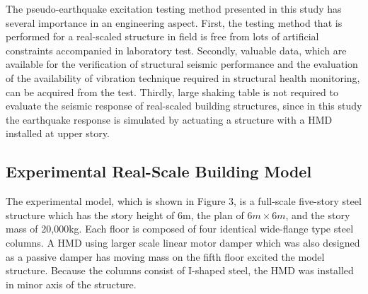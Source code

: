 The pseudo-earthquake excitation testing method presented in this study has several importance in an engineering aspect. First, the testing method that is performed for a real-scaled structure in field is free from lots of artificial constraints accompanied in laboratory test. Secondly, valuable data, which are available for the verification of structural seismic performance and the evaluation of the availability of vibration technique required in structural health monitoring, can be acquired from the test. Thirdly, large shaking table is not required to evaluate the seismic response of real-scaled building structures, since in this study the earthquake response is simulated by actuating a structure with a HMD installed at upper story.

\subsection{Experimental Real-Scale Building Model}
The experimental model, which is shown in Figure 3, is a full-scale five-story steel structure which has the story height of 6m, the plan of $6m\times6m$, and the story mass of 20,000kg. Each floor is composed of four identical wide-flange type steel columns. A HMD using larger scale linear motor damper which was also designed as a passive damper has moving mass on the fifth floor excited the model structure. Because the columns consist of I-shaped steel, the HMD was installed in minor axis of the structure.

